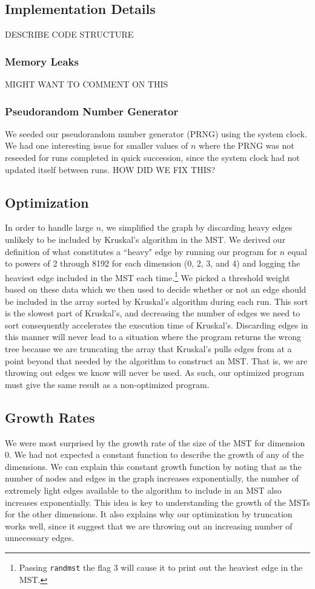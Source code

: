 \documentclass[solution, letterpaper]{cs121}
\begin{document}
\subsection*{Implementation Details}
DESCRIBE CODE STRUCTURE

\subsubsection*{Memory Leaks}
MIGHT WANT TO COMMENT ON THIS

\subsubsection*{Pseudorandom Number Generator}
We seeded our pseudorandom number generator (PRNG) using the system clock. We had one interesting issue for smaller values of $n$ where the PRNG was not reseeded for runs completed in quick succession, since the system clock had not updated itself between runs. HOW DID WE FIX THIS?

\subsection*{Optimization}
In order to handle large $n$, we simplified the graph by discarding heavy edges unlikely to be included by Kruskal's algorithm in the MST. We derived our definition of what constitutes a 	``heavy" edge by running our program for $n$ equal to powers of 2 through 8192 for each dimension (0, 2, 3, and 4) and logging the heaviest edge included in the MST each time.\footnote{Passing {\tt randmst} the flag 3 will cause it to print out the heaviest edge in the MST.} We picked a threshold weight based on these data which we then used to decide whether or not an edge should be included in the array sorted by Kruskal's algorithm during each run. This sort is the slowest part of Kruskal's, and decreasing the number of edges we need to sort consequently accelerates the execution time of Kruskal's. Discarding edges in this manner will never lead to a situation where the program returns the wrong tree because we are truncating the array that Kruskal's pulls edges from at a point beyond that needed by the algorithm to construct an MST. That is, we are throwing out edges we know will never be used. As such, our optimized program must give the same result as a non-optimized program.

\subsection*{Growth Rates}
We were most surprised by the growth rate of the size of the MST for dimension 0. We had not expected a constant function to describe the growth of any of the dimensions. We can explain this constant growth function by noting that as the number of nodes and edges in the graph increases exponentially, the number of extremely light edges available to the algorithm to include in an MST also increases exponentially. This idea is key to understanding the growth of the MSTs for the other dimensions. It also explains why our optimization by truncation works well, since it suggest that we are throwing out an increasing number of unnecessary edges.
\end{document}
